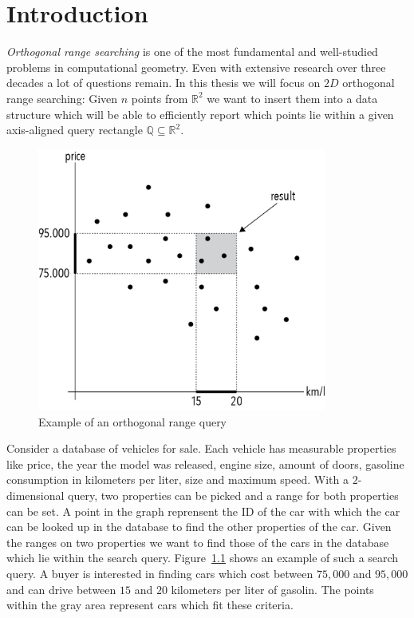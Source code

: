 \chapter{Introduction}
\label{ch:intro}

\noindent \emph{Orthogonal range searching} is one of the most fundamental and well-studied problems in computational geometry. Even with extensive research over three decades a lot of questions remain. In this thesis we will focus on $2D$ orthogonal range searching: Given $n$ points from $\mathbb{R}^2$ we want to insert them into a data structure which will be able to efficiently report which points lie within a given axis-aligned query rectangle $\mathbb{Q} \subseteq \mathbb{R}^2$.

\begin{figure}[h]
    \centering
    \includegraphics[width = 0.85\textwidth]{pictures/introduction.png}
    \caption{Example of an orthogonal range query}\label{fig:example}
\end{figure}

\noindent Consider a database of vehicles for sale. Each vehicle has measurable properties like price, the year the model was released, engine size, amount of doors, gasoline consumption in kilometers per liter, size  and maximum speed. With a $2$-dimensional query, two properties can be picked and a range for both properties can be set. A point in the graph reprensent the ID of the car with which the car can be looked up in the database to find the other properties of the car. Given the ranges on two properties we want to find those of the cars in the database which lie within the search query. Figure~\ref{fig:example} shows an example of such a search query. A buyer is interested in finding cars which cost between $75,000$ and $95,000$ and can drive between $15$ and $20$ kilometers per liter of gasolin. The points within the gray area represent cars which fit these criteria.\\

